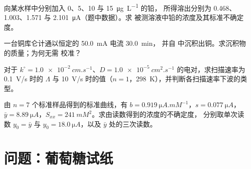 \begin{exercise}[$\star\star$]\label{exo:b3:electrode-kinetics:9}
向某水样中分别加入 0、5、10 与 \qty{15}{\micro g.L^{-1}} 的铅，
所得溶出分别为 0.468、1.003、1.571 与 \qty{2.101}{\micro A}（题中数据）。求
被测溶液中铅的浓度及其标准不确定度。
\end{exercise}

\begin{exercise}[$\star\star\star$]\label{exo:b3:electrode-kinetics:10}
一台铜库仑计通以恒定的 \qty{50.0}{mA} 电流 \qty{30.0}{min}，
并自  中沉积出铜。求沉积物的质量；为何无需
校准？
\end{exercise}

\begin{exercise}[$\star\star\star$]\label{exo:b3:electrode-kinetics:11}
对于 $k^\circ = \qty{1.0e-2}{cm.s^{-1}}$、$D = \qty{1.0e-5}{cm^2.s^{-1}}$ 的电对，求扫描速率为 \qty{0.1}{V/s}
时的 $\Lambda$ 与 \qty{10}{V/s} 时的值（$n = 1$，\qty{298}{K}），并判断各扫描速率下波的类型。
\end{exercise}

\begin{exercise}[$\star\star\star$]\label{exo:b3:electrode-kinetics:12}
由 $n = 7$ 个标准样品得到的标准曲线，有 $b = \qty{0.919}{\micro A.mM^{-1}}$，$s = \qty{0.077}{\micro A}$，
$\bar y = \qty{8.89}{\micro A}$，$S_{xx} = \qty{241}{mM^2}$。求由读数得到的浓度的不确定度，
分别取单次读数 $y_0 = \bar y$ 与 $y_0 = \qty{18.0}{\micro A}$，以及 $\bar y$ 处的三次读数。
\end{exercise}

\section{问题：葡萄糖试纸}

